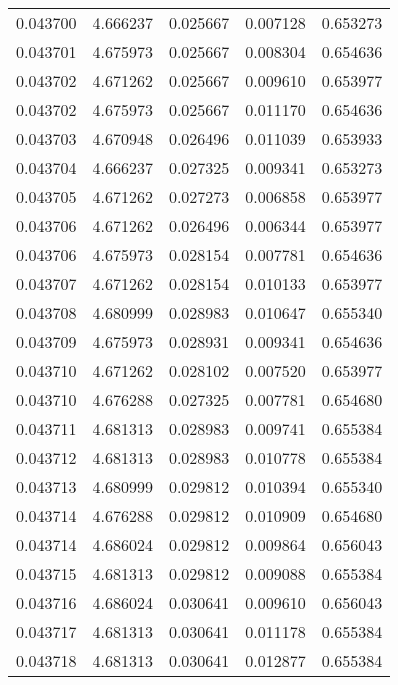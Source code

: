 \begin{tabular}{lrrrr}
0.043700    &  4.666237 &  0.025667 &  0.007128 &             0.653273 \\
0.043701    &  4.675973 &  0.025667 &  0.008304 &             0.654636 \\
0.043702    &  4.671262 &  0.025667 &  0.009610 &             0.653977 \\
0.043702    &  4.675973 &  0.025667 &  0.011170 &             0.654636 \\
0.043703    &  4.670948 &  0.026496 &  0.011039 &             0.653933 \\
0.043704    &  4.666237 &  0.027325 &  0.009341 &             0.653273 \\
0.043705    &  4.671262 &  0.027273 &  0.006858 &             0.653977 \\
0.043706    &  4.671262 &  0.026496 &  0.006344 &             0.653977 \\
0.043706    &  4.675973 &  0.028154 &  0.007781 &             0.654636 \\
0.043707    &  4.671262 &  0.028154 &  0.010133 &             0.653977 \\
0.043708    &  4.680999 &  0.028983 &  0.010647 &             0.655340 \\
0.043709    &  4.675973 &  0.028931 &  0.009341 &             0.654636 \\
0.043710    &  4.671262 &  0.028102 &  0.007520 &             0.653977 \\
0.043710    &  4.676288 &  0.027325 &  0.007781 &             0.654680 \\
0.043711    &  4.681313 &  0.028983 &  0.009741 &             0.655384 \\
0.043712    &  4.681313 &  0.028983 &  0.010778 &             0.655384 \\
0.043713    &  4.680999 &  0.029812 &  0.010394 &             0.655340 \\
0.043714    &  4.676288 &  0.029812 &  0.010909 &             0.654680 \\
0.043714    &  4.686024 &  0.029812 &  0.009864 &             0.656043 \\
0.043715    &  4.681313 &  0.029812 &  0.009088 &             0.655384 \\
0.043716    &  4.686024 &  0.030641 &  0.009610 &             0.656043 \\
0.043717    &  4.681313 &  0.030641 &  0.011178 &             0.655384 \\
0.043718    &  4.681313 &  0.030641 &  0.012877 &             0.655384 \\

\end{tabular}
